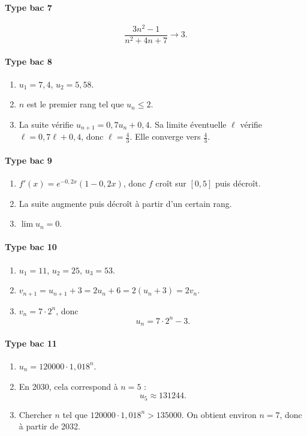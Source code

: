 \documentclass[11pt,a4paper]{article}
\theoremstyle{definition}
\begin{document}
\paragraph{Type bac 7}
\[
\frac{3n^2-1}{n^2+4n+7}\to 3.
\]

\paragraph{Type bac 8}
\begin{enumerate}[label=\arabic*.]
    \item $u_1=7{,}4$, $u_2=5{,}58$.
    \item $n$ est le premier rang tel que $u_n\le2$.
    \item La suite vérifie $u_{n+1}=0{,}7u_n+0{,}4$. Sa limite éventuelle $\ell$ vérifie $\ell=0{,}7\ell+0{,}4$, donc $\ell=\frac43$. Elle converge vers $\frac43$.
\end{enumerate}

\paragraph{Type bac 9}
\begin{enumerate}[label=\arabic*.]
    \item $f'(x)=e^{-0,2x}(1-0,2x)$, donc $f$ croît sur $[0,5]$ puis décroît.
    \item La suite augmente puis décroît à partir d'un certain rang.
    \item $\lim u_n=0$.
\end{enumerate}

\paragraph{Type bac 10}
\begin{enumerate}[label=\arabic*.]
    \item $u_1=11$, $u_2=25$, $u_3=53$.
    \item $v_{n+1}=u_{n+1}+3=2u_n+6=2(u_n+3)=2v_n$.
    \item $v_n=7\cdot 2^n$, donc
    \[
    u_n=7\cdot 2^n-3.
    \]
\end{enumerate}

\paragraph{Type bac 11}
\begin{enumerate}[label=\arabic*.]
    \item $u_n=120000\cdot 1{,}018^n$.
    \item En 2030, cela correspond à $n=5$ :
    \[
    u_5\approx 131244.
    \]
    \item Chercher $n$ tel que $120000\cdot 1{,}018^n>135000$. On obtient environ $n=7$, donc à partir de 2032.
\end{enumerate}
\end{document}
